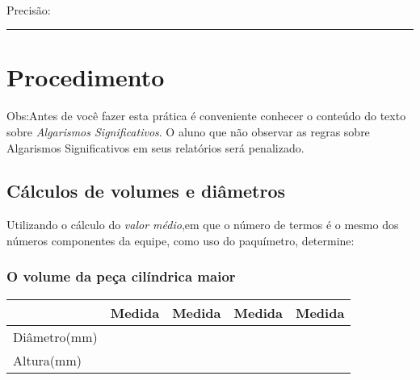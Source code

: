 \begin{minipage}{\linewidth}
\begin{minipage}{0.4\linewidth}
\\

Precisão:\rule{3cm}{0.4pt}
\end{minipage}
\end{minipage}

\section{Procedimento}
Obs:Antes de você fazer esta prática é conveniente conhecer o conteúdo do texto sobre \emph{Algarismos Significativos}. O aluno que não observar as regras sobre Algarismos Significativos em seus relatórios será penalizado.

\subsection{Cálculos de volumes e diâmetros}
Utilizando o cálculo do \emph{valor médio},em que o número de termos  é o mesmo dos números componentes da equipe, como uso do paquímetro, determine:

\subsubsection{O volume da peça cilíndrica maior} 
\begin{table}[h]
\centering
\begin{tabular}{|l|*{4}{c|}}
\hline & Medida& Medida& Medida& Medida \\
\hline Diâmetro(mm)& & &  & \\ 
\hline Altura(mm)& & &  & \\ 
\hline
\end{tabular}

\end{table}

